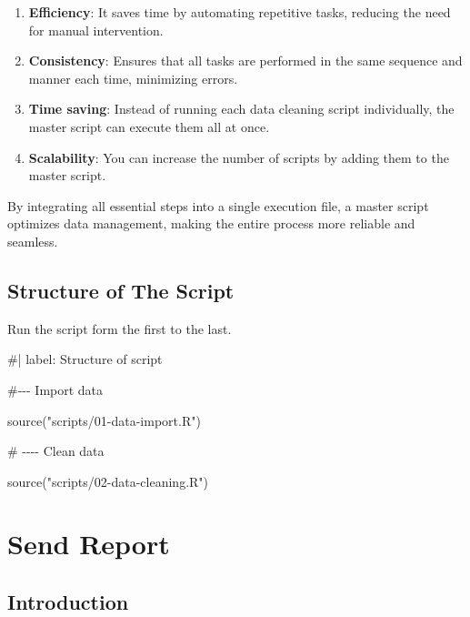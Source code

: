 \documentclass[
  letterpaper,
  DIV=11,
  numbers=noendperiod]{scrreprt}
\newenvironment{Shaded}{\begin{snugshade}}{\end{snugshade}}
\newcommand{\CommentTok}[1]{\textcolor[rgb]{0.37,0.37,0.37}{#1}}
\newcommand{\FunctionTok}[1]{\textcolor[rgb]{0.28,0.35,0.67}{#1}}
\newcommand{\NormalTok}[1]{\textcolor[rgb]{0.00,0.23,0.31}{#1}}
\newcommand{\StringTok}[1]{\textcolor[rgb]{0.13,0.47,0.30}{#1}}
\begin{document}
\begin{enumerate}
\def\labelenumi{\arabic{enumi}.}
\item
  \textbf{Efficiency}: It saves time by automating repetitive tasks,
  reducing the need for manual intervention.
\item
  \textbf{Consistency}: Ensures that all tasks are performed in the same
  sequence and manner each time, minimizing errors.
\item
  \textbf{Time saving}: Instead of running each data cleaning script
  individually, the master script can execute them all at once.
\item
  \textbf{Scalability}: You can increase the number of scripts by adding
  them to the master script.
\end{enumerate}

By integrating all essential steps into a single execution file, a
master script optimizes data management, making the entire process more
reliable and seamless.

\section{Structure of The Script}\label{structure-of-the-script}

Run the script form the first to the last.

\begin{Shaded}
\begin{Highlighting}[]
\CommentTok{\#| label: Structure of script}

\CommentTok{\#{-}{-}{-} Import data }

\FunctionTok{source}\NormalTok{(}\StringTok{"scripts/01{-}data{-}import.R"}\NormalTok{)}

\CommentTok{\# {-}{-}{-}{-} Clean data}

\FunctionTok{source}\NormalTok{(}\StringTok{"scripts/02{-}data{-}cleaning.R"}\NormalTok{)}
\end{Highlighting}
\end{Shaded}


\chapter{Send Report}\label{send-report}

\section{Introduction}\label{introduction-6}
\end{document}
